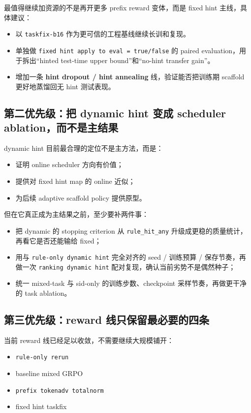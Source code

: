 \documentclass[a4paper]{article}
\begin{document}
最值得继续加资源的不是再开更多 prefix reward 变体，而是 fixed hint 主线，具体建议：
\begin{itemize}
\item 以 \texttt{taskfix-b16} 作为更可信的工程基线继续长训和复现。
\item 单独做 \texttt{fixed hint apply to eval = true/false} 的 paired evaluation，用于拆出“hinted test-time upper bound”和“no-hint transfer gain”。
\item 增加一条 \textbf{hint dropout / hint annealing} 线，验证能否把训练期 scaffold 更好地蒸馏回无 hint 测试表现。
\end{itemize}

\subsection{第二优先级：把 dynamic hint 变成 scheduler ablation，而不是主结果}

dynamic hint 目前最合理的定位不是主方法，而是：
\begin{itemize}
\item 证明 online scheduler 方向有价值；
\item 提供对 fixed hint map 的 online 近似；
\item 为后续 adaptive scaffold policy 提供原型。
\end{itemize}

但在它真正成为主结果之前，至少要补两件事：
\begin{itemize}
\item 把 dynamic 的 stopping criterion 从 \texttt{rule\_hit\_any} 升级成更稳的质量统计，再看它是否还能输给 fixed；
\item 用与 \texttt{rule-only dynamic hint} 完全对齐的 seed / 训练预算 / 保存节奏，再做一次 \texttt{ranking dynamic hint} 配对复现，确认当前劣势不是偶然种子；
\item 统一 mixed-task 与 sid-only 的训练步数、checkpoint 采样节奏，再做更干净的 task ablation。
\end{itemize}

\subsection{第三优先级：reward 线只保留最必要的四条}

当前 reward 线已经足以收敛，不需要继续大规模铺开：
\begin{itemize}
\item \texttt{rule-only rerun}
\item baseline mixed GRPO
\item \texttt{prefix tokenadv totalnorm}
\item fixed hint taskfix
\end{itemize}
\end{document}
